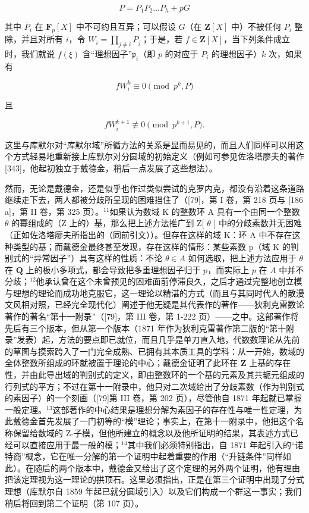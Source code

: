 \[
P = P _ {1} P _ {2} \dots P _ {h} + p G
\]

其中 \(\overline{P}_i\) 在 \(\mathbf{F}_p[X]\) 中不可约且互异；可以假设 \(G\)（在 \(\mathbf{Z}[X]\) 中）不被任何 \(P_i\) 整除，并且对所有 \(i\)，令 \(W_i = \prod_{j \neq i} P_j\)；于是，若 \(f \in \mathbf{Z}[X]\)，当下列条件成立时，我们就说 \(f(\xi)\) 含“理想因子”\(\mathfrak{p}_i\)（即 \(p\) 的对应于 \(P_i\) 的理想因子）\(k\) 次，如果有

\[
f W _ {i} ^ {k} \equiv 0 \pmod {p ^ {k}, P}
\]

且

\[
f W _ {i} ^ {k + 1} \not \equiv 0 \pmod {p ^ {k + 1}, P}.
\]

这里与库默尔对“库默尔域”所循方法的关系是显而易见的，而且人们同样可以用这个方式轻易地重新接上库默尔对分圆域的初始定义（例如可参见佐洛塔廖夫的著作 {[}343{]}，他起初独立于戴德金，稍后一点发展了这些想法）。

然而，无论是戴德金，还是似乎也作过类似尝试的克罗内克，都没有沿着这条道路继续走下去，两人都被分歧所呈现的困难挡住了（{[}79{]}，第 I 卷，第 218 页与 {[}186 a{]}，第 II 卷，第 325 页）。\(^{11}\)如果认为数域 K 的整数环 A 具有一个由同一个整数 \(\theta\) 的幂组成的（Z 上的）基，那么把上述方法推广到 Z{[} \(\theta\) {]} 中的分歧素数并无困难（正如佐洛塔廖夫所指出的（同前引文））。但存在这样的域 K：环 A 中不存在这种类型的基；而戴德金最终甚至发现，存在这样的情形：某些素数 p（域 K 的判别式的“异常因子”）具有这样的性质：不论 \(\theta \in A\) 如何选取，把上述方法应用于 \(\theta\) 在 \(\mathbf{Q}\) 上的极小多项式，都会导致把多重理想因子归于 \(p\)，而实际上 \(p\) 在 \(A\) 中并不分歧；\(^{12}\)他承认曾在这个未曾预见的困难面前停滞良久，之后才通过完整地创立模与理想的理论而成功地克服它，这一理论以精湛的方式（而且与其同时代人的散漫文风相对照，已经完全现代化）阐述于他无疑是其代表作的著作——狄利克雷数论著作的著名“第十一附录”（{[}79{]}，第 III 卷，第 1-222 页）——之中。这部著作将先后有三个版本，但从第一个版本（1871 年作为狄利克雷著作第二版的“第十附录”发表）起，方法的要点即已就位，而且几乎是单刀直入地，代数数理论从先前的草图与摸索跨入了一门完全成熟、已拥有其本质工具的学科：从一开始，数域的全体整数所组成的环就被置于理论的中心；戴德金证明了此环在 \(\mathbf{Z}\) 上基的存在性，并由此导出域的判别式的定义，即由整数环的一个基的元素及其共轭元组成的行列式的平方；不过在第十一附录中，他只对二次域给出了分歧素数（作为判别式的素因子）的一个刻画（{[}79{]}第 III 卷，第 202 页），尽管他自 1871 年起就已掌握一般定理。\(^{13}\)这部著作的中心结果是理想分解为素因子的存在性与唯一性定理，为此戴德金首先发展了一门初等的“模”理论；事实上，在第十一附录中，他把这个名称保留给数域的 Z-子模，但他所建立的概念以及他所证明的结果，其表述方式已经可以直接应用于最一般的模；\(^{14}\)其中我们必须特别指出，自 1871 年起引入的“诺特商”概念，它在唯一分解的第一个证明中起着重要的作用（“升链条件”同样如此）。在随后的两个版本中，戴德金又给出了这个定理的另外两个证明，他有理由把该定理视为这一理论的拱顶石。这里必须指出，正是在第三个证明中出现了分式理想（库默尔自 1859 年起已就分圆域引入）以及它们构成一个群这一事实；我们稍后将回到第二个证明（第 107 页）。


